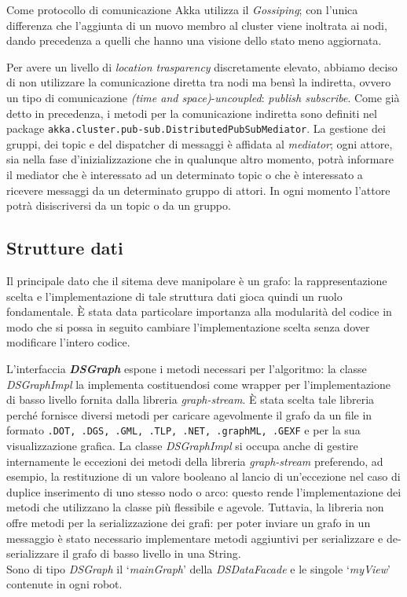 Come protocollo di comunicazione Akka utilizza il \emph{Gossiping};
con l'unica differenza che l'aggiunta di un nuovo membro al cluster viene
inoltrata ai nodi, dando precedenza a quelli che hanno una visione
dello stato meno aggiornata.

Per avere un livello di \emph{location trasparency} discretamente elevato,
abbiamo deciso di non utilizzare la comunicazione diretta tra nodi ma bensì
la indiretta, ovvero un tipo di comunicazione \emph{(time and space)}-\emph{uncoupled}:
 \emph{publish subscribe}.
Come già detto in precedenza, i metodi per la comunicazione indiretta
sono definiti nel package \texttt{akka.cluster.pub-sub.DistributedPubSubMediator}.
La gestione dei gruppi, dei topic e del dispatcher di messaggi è affidata al \emph{mediator};
ogni attore, sia nella fase d'inizializzazione che in qualunque altro momento, potrà informare
il mediator che è interessato ad un determinato topic o che è interessato a ricevere messaggi
da un determinato gruppo di attori. In ogni momento l'attore potrà disiscriversi da un topic o da un gruppo.
 





\subsection{Strutture dati}
Il principale dato che il sitema deve manipolare è un grafo:
la rappresentazione scelta e l'implementazione di tale struttura dati
gioca quindi un ruolo fondamentale. \`E stata data particolare
importanza alla modularità del codice in modo che si possa in seguito
cambiare l'implementazione scelta senza dover modificare l'intero
codice.

L'interfaccia \textbf{\emph{DSGraph}} espone i metodi necessari per
l'algoritmo: la classe \emph{DSGraphImpl} la implementa costituendosi
come wrapper per l'implementazione di basso livello fornita dalla
libreria \emph{graph-stream}. \`E stata scelta tale libreria perché
fornisce diversi metodi per caricare agevolmente il grafo da un file
in formato \texttt{.DOT, .DGS, .GML, .TLP, .NET, .graphML, .GEXF}
e per la sua visualizzazione grafica.
La classe \emph{DSGraphImpl} si occupa anche di gestire internamente
le eccezioni dei metodi della libreria \emph{graph-stream} preferendo,
ad esempio,
la restituzione di un valore booleano al lancio di un'eccezione
nel caso di duplice inserimento di uno stesso nodo o arco: questo
rende l'implementazione dei metodi che utilizzano la classe più
flessibile e agevole.
Tuttavia, la libreria non offre metodi per la serializzazione
dei grafi: per poter inviare un grafo in un messaggio è stato
necessario implementare metodi aggiuntivi per serializzare e
de-serializzare il grafo di basso livello in una String.\\
Sono di tipo \emph{DSGraph} il `\emph{mainGraph}' della
\emph{DSDataFacade} e le singole `\emph{myView}' contenute in ogni
robot.


